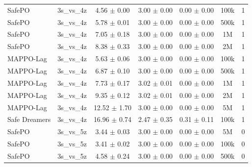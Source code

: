 \begin{longtable}{lcccccc}
SafePO & 3s\_vs\_4z & \textcolor{green!60!black}{4.56 $\pm$ 0.00} & \textcolor{green!60!black}{3.00 $\pm$ 0.00} & \textcolor{green!60!black}{0.00 $\pm$ 0.00} & 100k & 1 \\
SafePO & 3s\_vs\_4z & \textcolor{green!60!black}{5.78 $\pm$ 0.01} & \textcolor{green!60!black}{3.00 $\pm$ 0.00} & \textcolor{green!60!black}{0.00 $\pm$ 0.00} & 500k & 1 \\
SafePO & 3s\_vs\_4z & \textcolor{green!60!black}{7.05 $\pm$ 0.18} & \textcolor{green!60!black}{3.00 $\pm$ 0.00} & \textcolor{green!60!black}{0.00 $\pm$ 0.00} & 1M & 1 \\
SafePO & 3s\_vs\_4z & \textcolor{green!60!black}{8.38 $\pm$ 0.33} & \textcolor{green!60!black}{3.00 $\pm$ 0.00} & \textcolor{green!60!black}{0.00 $\pm$ 0.00} & 2M & 1 \\
MAPPO-Lag & 3s\_vs\_4z & \textcolor{green!60!black}{5.63 $\pm$ 0.06} & \textcolor{green!60!black}{3.00 $\pm$ 0.00} & \textcolor{green!60!black}{0.00 $\pm$ 0.00} & 100k & 1 \\
MAPPO-Lag & 3s\_vs\_4z & \textcolor{green!60!black}{6.87 $\pm$ 0.10} & \textcolor{green!60!black}{3.00 $\pm$ 0.00} & \textcolor{green!60!black}{0.00 $\pm$ 0.00} & 500k & 1 \\
MAPPO-Lag & 3s\_vs\_4z & \textcolor{green!60!black}{7.73 $\pm$ 0.17} & \textcolor{green!60!black}{3.02 $\pm$ 0.01} & \textcolor{green!60!black}{0.00 $\pm$ 0.00} & 1M & 1 \\
MAPPO-Lag & 3s\_vs\_4z & \textcolor{green!60!black}{9.35 $\pm$ 0.12} & \textcolor{green!60!black}{3.02 $\pm$ 0.01} & \textcolor{green!60!black}{0.00 $\pm$ 0.00} & 2M & 1 \\
MAPPO-Lag & 3s\_vs\_4z & \textcolor{green!60!black}{12.52 $\pm$ 1.70} & \textcolor{green!60!black}{3.00 $\pm$ 0.00} & \textcolor{green!60!black}{0.00 $\pm$ 0.00} & 5M & 1 \\
Safe Dreamers & 3s\_vs\_4z & 16.96 $\pm$ 0.74 & 2.47 $\pm$ 0.35 & 0.31 $\pm$ 0.11 & 100k & 1 \\
\midrule
SafePO & 3s\_vs\_5z & \textcolor{green!60!black}{3.44 $\pm$ 0.03} & \textcolor{green!60!black}{3.00 $\pm$ 0.00} & \textcolor{green!60!black}{0.00 $\pm$ 0.00} & 5M & 0 \\
SafePO & 3s\_vs\_5z & \textcolor{green!60!black}{3.41 $\pm$ 0.02} & \textcolor{green!60!black}{3.00 $\pm$ 0.00} & \textcolor{green!60!black}{0.00 $\pm$ 0.00} & 100k & 0 \\
SafePO & 3s\_vs\_5z & \textcolor{green!60!black}{4.58 $\pm$ 0.24} & \textcolor{green!60!black}{3.00 $\pm$ 0.00} & \textcolor{green!60!black}{0.00 $\pm$ 0.00} & 500k & 0 \\

\end{longtable}

